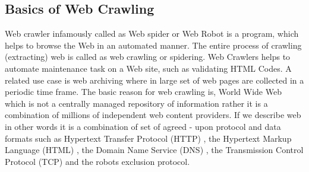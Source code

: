\documentclass[article,type=msc,colorback,accentcolor=tud9c,twoside,11pt]{tudthesis}
\begin{document}
\subsection{Basics of Web Crawling}

Web crawler\cite{WebCrawlerAReview} infamously called as Web spider or Web Robot is a program, which helps to browse the Web in an automated manner. The entire process of crawling (extracting) web is called  as web crawling or spidering. Web Crawlers helps to automate maintenance task on a Web site, such as validating HTML Codes. A related use case is web archiving where in large set of web pages are collected in a periodic time frame. The basic reason for web crawling is, World Wide Web which is not a centrally managed repository of information rather it is a combination of millions of independent web content providers. If we describe web in other words it is a combination of set of agreed - upon protocol and data formats such as Hypertext Transfer Protocol (HTTP) , the Hypertext Markup Language (HTML) , the Domain Name Service (DNS) , the Transmission Control Protocol (TCP) and the robots exclusion protocol. 
\end{document}
